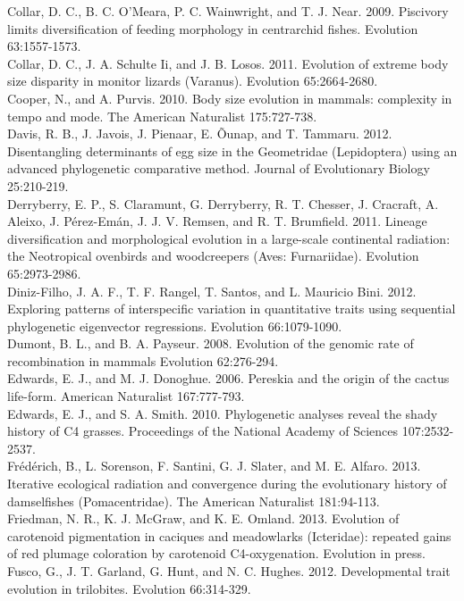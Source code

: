 Collar, D. C., B. C. O'Meara, P. C. Wainwright, and T. J. Near. 2009. Piscivory limits diversification of feeding morphology in centrarchid fishes. Evolution 63:1557-1573.\\
Collar, D. C., J. A. Schulte Ii, and J. B. Losos. 2011. Evolution of extreme body size disparity in monitor lizards (Varanus). Evolution 65:2664-2680.\\
Cooper, N., and A. Purvis. 2010. Body size evolution in mammals: complexity in tempo and mode. The American Naturalist 175:727-738.\\
Davis, R. B., J. Javois, J. Pienaar, E. Õunap, and T. Tammaru. 2012. Disentangling determinants of egg size in the Geometridae (Lepidoptera) using an advanced phylogenetic comparative method. Journal of Evolutionary Biology 25:210-219.\\
Derryberry, E. P., S. Claramunt, G. Derryberry, R. T. Chesser, J. Cracraft, A. Aleixo, J. Pérez-Emán, J. J. V. Remsen, and R. T. Brumfield. 2011. Lineage diversification and morphological evolution in a large-scale continental radiation: the Neotropical ovenbirds and woodcreepers (Aves: Furnariidae). Evolution 65:2973-2986.\\
Diniz-Filho, J. A. F., T. F. Rangel, T. Santos, and L. Mauricio Bini. 2012. Exploring patterns of interspecific variation in quantitative traits using sequential phylogenetic eigenvector regressions. Evolution 66:1079-1090.\\
Dumont, B. L., and B. A. Payseur. 2008. Evolution of the genomic rate of recombination in mammals Evolution 62:276-294.\\
Edwards, E. J., and M. J. Donoghue. 2006. Pereskia and the origin of the cactus life-form. American Naturalist 167:777-793.\\
Edwards, E. J., and S. A. Smith. 2010. Phylogenetic analyses reveal the shady history of C4 grasses. Proceedings of the National Academy of Sciences 107:2532-2537.\\
Fr\'{e}d\'{e}rich, B., L. Sorenson, F. Santini, G. J. Slater, and M. E. Alfaro. 2013. Iterative ecological radiation and convergence during the evolutionary history of damselfishes (Pomacentridae). The American Naturalist 181:94-113.\\
Friedman, N. R., K. J. McGraw, and K. E. Omland. 2013. Evolution of carotenoid pigmentation in caciques and meadowlarks (Icteridae): repeated gains of red plumage coloration by carotenoid C4-oxygenation. Evolution in press.\\
Fusco, G., J. T. Garland, G. Hunt, and N. C. Hughes. 2012. Developmental trait evolution in trilobites. Evolution 66:314-329.\\
